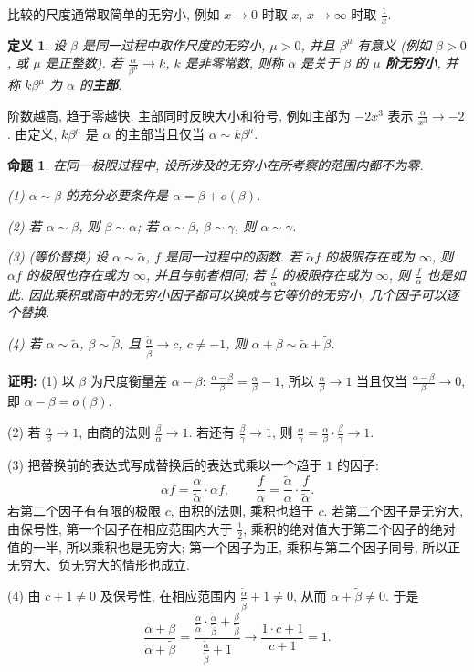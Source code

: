 \documentclass[UTF8,openany]{ctexbook}
\theoremstyle{chinesetextbook}
\newtheorem{definition}{定义}[section]
\newtheorem{proposition}{命题}[section]
\newenvironment{cnproof}{\par\indent\textbf{证明:} \ignorespaces}{\par}
\begin{document}
比较的尺度通常取简单的无穷小, 例如 $x\to0$ 时取 $x$, $x\to\infty$ 时取 $\displaystyle\frac1x$.
\begin{definition}
设 $\beta$ 是同一过程中取作尺度的无穷小, $\mu>0$, 并且 $\beta^\mu$ 有意义 (例如 $\beta>0$, 或 $\mu$ 是正整数). 若 $\displaystyle\frac\alpha{\beta^\mu}\to k$, $k$ 是非零常数, 则称 $\alpha$ 是关于 $\beta$ 的 \textbf{$\mu$ 阶无穷小}, 并称 $k\beta^\mu$ 为 $\alpha$ 的\textbf{主部}.
\end{definition}
阶数越高, 趋于零越快. 主部同时反映大小和符号, 例如主部为 $-2x^3$ 表示 $\displaystyle\frac\alpha{x^3}\to-2$. 由定义, $k\beta^\mu$ 是 $\alpha$ 的主部当且仅当 $\alpha\sim k\beta^\mu$.
\begin{proposition}
在同一极限过程中, 设所涉及的无穷小在所考察的范围内都不为零.

\textup{(1)} $\alpha\sim\beta$ 的充分必要条件是 $\alpha=\beta+o(\beta)$.

\textup{(2)} 若 $\alpha\sim\beta$, 则 $\beta\sim\alpha$; 若 $\alpha\sim\beta$, $\beta\sim\gamma$, 则 $\alpha\sim\gamma$.

\textup{(3)} (等价替换) 设 $\alpha\sim\widetilde\alpha$, $f$ 是同一过程中的函数. 若 $\widetilde\alpha f$ 的极限存在或为 $\infty$, 则 $\alpha f$ 的极限也存在或为 $\infty$, 并且与前者相同; 若 $\displaystyle\frac f{\widetilde\alpha}$ 的极限存在或为 $\infty$, 则 $\displaystyle\frac f\alpha$ 也是如此. 因此乘积或商中的无穷小因子都可以换成与它等价的无穷小, 几个因子可以逐个替换.

\textup{(4)} 若 $\alpha\sim\widetilde\alpha$, $\beta\sim\widetilde\beta$, 且 $\displaystyle\frac{\widetilde\alpha}{\widetilde\beta}\to c$, $c\ne-1$, 则 $\alpha+\beta\sim\widetilde\alpha+\widetilde\beta$.
\end{proposition}
\begin{cnproof}
(1) 以 $\beta$ 为尺度衡量差 $\alpha-\beta$: $\displaystyle\frac{\alpha-\beta}\beta=\frac\alpha\beta-1$, 所以 $\displaystyle\frac\alpha\beta\to1$ 当且仅当 $\displaystyle\frac{\alpha-\beta}\beta\to0$, 即 $\alpha-\beta=o(\beta)$.

(2) 若 $\displaystyle\frac\alpha\beta\to1$, 由商的法则 $\displaystyle\frac\beta\alpha\to1$. 若还有 $\displaystyle\frac\beta\gamma\to1$, 则 $\displaystyle\frac\alpha\gamma=\frac\alpha\beta\cdot\frac\beta\gamma\to1$.

(3) 把替换前的表达式写成替换后的表达式乘以一个趋于 $1$ 的因子:
\[
\alpha f=\frac\alpha{\widetilde\alpha}\cdot\widetilde\alpha f,\qquad\frac f\alpha=\frac{\widetilde\alpha}\alpha\cdot\frac f{\widetilde\alpha}.
\]
若第二个因子有有限的极限 $c$, 由积的法则, 乘积也趋于 $c$. 若第二个因子是无穷大, 由保号性, 第一个因子在相应范围内大于 $\displaystyle\frac12$, 乘积的绝对值大于第二个因子的绝对值的一半, 所以乘积也是无穷大; 第一个因子为正, 乘积与第二个因子同号, 所以正无穷大、负无穷大的情形也成立.

(4) 由 $c+1\ne0$ 及保号性, 在相应范围内 $\displaystyle\frac{\widetilde\alpha}{\widetilde\beta}+1\ne0$, 从而 $\widetilde\alpha+\widetilde\beta\ne0$. 于是
\[
\frac{\alpha+\beta}{\widetilde\alpha+\widetilde\beta}=\frac{\frac\alpha{\widetilde\alpha}\cdot\frac{\widetilde\alpha}{\widetilde\beta}+\frac\beta{\widetilde\beta}}{\frac{\widetilde\alpha}{\widetilde\beta}+1}\to\frac{1\cdot c+1}{c+1}=1.
\]
\end{cnproof}
\end{document}
